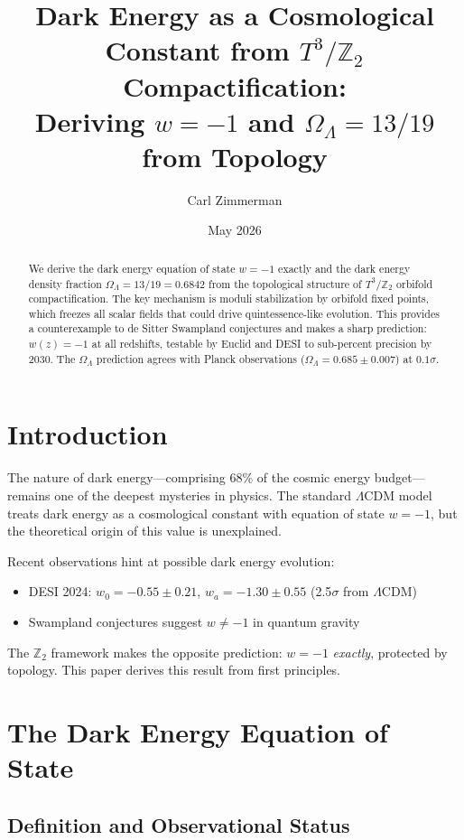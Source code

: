 \documentclass[12pt,a4paper]{article}
\title{Dark Energy as a Cosmological Constant from $T^3/\mathbb{Z}_2$ Compactification:\\
Deriving $w = -1$ and $\Omega_\Lambda = 13/19$ from Topology}
\author{Carl Zimmerman}
\date{May 2026}
\begin{document}
\maketitle

\begin{abstract}
We derive the dark energy equation of state $w = -1$ exactly and the dark energy density fraction $\Omega_\Lambda = 13/19 = 0.6842$ from the topological structure of $T^3/\mathbb{Z}_2$ orbifold compactification. The key mechanism is moduli stabilization by orbifold fixed points, which freezes all scalar fields that could drive quintessence-like evolution. This provides a counterexample to de Sitter Swampland conjectures and makes a sharp prediction: $w(z) = -1$ at all redshifts, testable by Euclid and DESI to sub-percent precision by 2030. The $\Omega_\Lambda$ prediction agrees with Planck observations ($\Omega_\Lambda = 0.685 \pm 0.007$) at $0.1\sigma$.
\end{abstract}

\section{Introduction}

The nature of dark energy---comprising 68\% of the cosmic energy budget---remains one of the deepest mysteries in physics. The standard $\Lambda$CDM model treats dark energy as a cosmological constant with equation of state $w = -1$, but the theoretical origin of this value is unexplained.

Recent observations hint at possible dark energy evolution:
\begin{itemize}
    \item DESI 2024: $w_0 = -0.55 \pm 0.21$, $w_a = -1.30 \pm 0.55$ (2.5$\sigma$ from $\Lambda$CDM)
    \item Swampland conjectures suggest $w \neq -1$ in quantum gravity
\end{itemize}

The $\mathbb{Z}_2$ framework makes the opposite prediction: $w = -1$ \textit{exactly}, protected by topology. This paper derives this result from first principles.

\section{The Dark Energy Equation of State}

\subsection{Definition and Observational Status}
\end{document}
